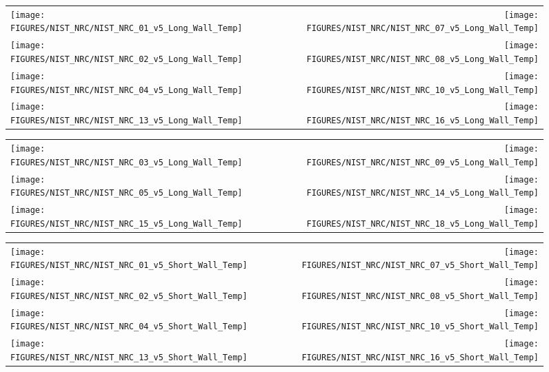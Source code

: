 \begin{figure}[h!]
\begin{tabular*}{\textwidth}{l@{\extracolsep{\fill}}r}
\texttt{[image: FIGURES/NIST\_NRC/NIST\_NRC\_01\_v5\_Long\_Wall\_Temp]} &
\texttt{[image: FIGURES/NIST\_NRC/NIST\_NRC\_07\_v5\_Long\_Wall\_Temp]} \\
\texttt{[image: FIGURES/NIST\_NRC/NIST\_NRC\_02\_v5\_Long\_Wall\_Temp]} &
\texttt{[image: FIGURES/NIST\_NRC/NIST\_NRC\_08\_v5\_Long\_Wall\_Temp]} \\
\texttt{[image: FIGURES/NIST\_NRC/NIST\_NRC\_04\_v5\_Long\_Wall\_Temp]} &
\texttt{[image: FIGURES/NIST\_NRC/NIST\_NRC\_10\_v5\_Long\_Wall\_Temp]} \\
\texttt{[image: FIGURES/NIST\_NRC/NIST\_NRC\_13\_v5\_Long\_Wall\_Temp]} &
\texttt{[image: FIGURES/NIST\_NRC/NIST\_NRC\_16\_v5\_Long\_Wall\_Temp]}
\end{tabular*}
\label{NIST_NRC_Long_Wall_Temp_Closed}
\end{figure}

\begin{figure}[h!]
\begin{tabular*}{\textwidth}{l@{\extracolsep{\fill}}r}
\texttt{[image: FIGURES/NIST\_NRC/NIST\_NRC\_03\_v5\_Long\_Wall\_Temp]} &
\texttt{[image: FIGURES/NIST\_NRC/NIST\_NRC\_09\_v5\_Long\_Wall\_Temp]} \\
\texttt{[image: FIGURES/NIST\_NRC/NIST\_NRC\_05\_v5\_Long\_Wall\_Temp]} &
\texttt{[image: FIGURES/NIST\_NRC/NIST\_NRC\_14\_v5\_Long\_Wall\_Temp]} \\
\texttt{[image: FIGURES/NIST\_NRC/NIST\_NRC\_15\_v5\_Long\_Wall\_Temp]} &
\texttt{[image: FIGURES/NIST\_NRC/NIST\_NRC\_18\_v5\_Long\_Wall\_Temp]}
\end{tabular*}
\label{NIST_NRC_Long_Wall_Temp_Open}
\end{figure}

\clearpage


\begin{figure}[h!]
\begin{tabular*}{\textwidth}{l@{\extracolsep{\fill}}r}
\texttt{[image: FIGURES/NIST\_NRC/NIST\_NRC\_01\_v5\_Short\_Wall\_Temp]} &
\texttt{[image: FIGURES/NIST\_NRC/NIST\_NRC\_07\_v5\_Short\_Wall\_Temp]} \\
\texttt{[image: FIGURES/NIST\_NRC/NIST\_NRC\_02\_v5\_Short\_Wall\_Temp]} &
\texttt{[image: FIGURES/NIST\_NRC/NIST\_NRC\_08\_v5\_Short\_Wall\_Temp]} \\
\texttt{[image: FIGURES/NIST\_NRC/NIST\_NRC\_04\_v5\_Short\_Wall\_Temp]} &
\texttt{[image: FIGURES/NIST\_NRC/NIST\_NRC\_10\_v5\_Short\_Wall\_Temp]} \\
\texttt{[image: FIGURES/NIST\_NRC/NIST\_NRC\_13\_v5\_Short\_Wall\_Temp]} &
\texttt{[image: FIGURES/NIST\_NRC/NIST\_NRC\_16\_v5\_Short\_Wall\_Temp]}
\end{tabular*}
\label{NIST_NRC_Short_Wall_Temp_Closed}
\end{figure}

